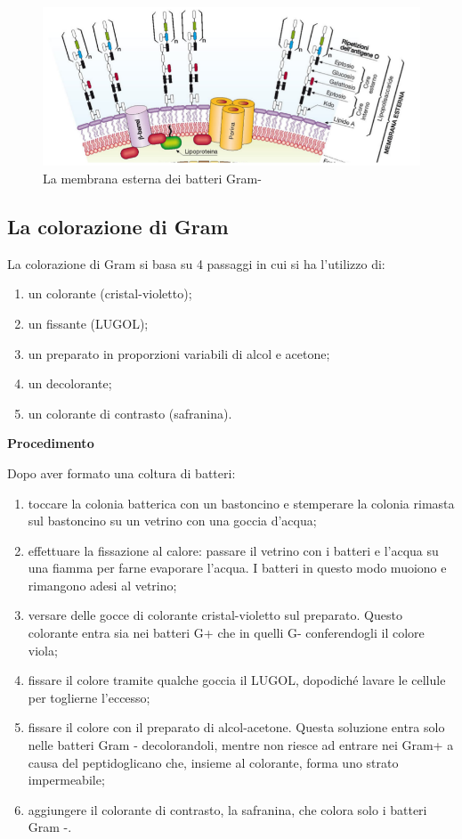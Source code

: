 \documentclass[11pt]{book}
\begin{document}
\begin{figure}[htp]
\centering
\includegraphics[scale=0.6]{img/Membrana esterna Gram-.png}
\caption{La membrana esterna dei batteri Gram-}
\label{}
\end{figure}



\subsection{La colorazione di Gram}
La colorazione di Gram si basa su 4 passaggi in cui si ha l’utilizzo di:
\begin{enumerate}
\item un colorante (cristal-violetto);
\item un fissante (LUGOL);
\item un preparato in proporzioni variabili di alcol e acetone;
\item un decolorante; 
\item un colorante di contrasto (safranina).
\end{enumerate}

\textbf{Procedimento}

Dopo aver formato una coltura di batteri:
\begin{enumerate}
\item toccare la colonia batterica con un bastoncino e stemperare la colonia rimasta sul bastoncino su un vetrino con una goccia d’acqua;
\item effettuare la fissazione al calore: passare il vetrino con i batteri e l’acqua su una fiamma per farne evaporare l’acqua. I batteri in questo modo muoiono e rimangono adesi al vetrino;
\item versare delle gocce di colorante cristal-violetto sul preparato. Questo colorante entra sia nei batteri G+ che in quelli G- conferendogli il colore viola;
\item fissare il colore tramite qualche goccia il LUGOL, dopodiché lavare le cellule per toglierne l’eccesso;
\item fissare il colore con il preparato di alcol-acetone. Questa soluzione entra solo nelle batteri Gram - decolorandoli, mentre non riesce ad entrare nei Gram+ a causa del peptidoglicano che, insieme al colorante, forma uno strato impermeabile;
\item aggiungere il colorante di contrasto, la safranina, che colora solo i batteri Gram -.
\end{enumerate}
\end{document}
